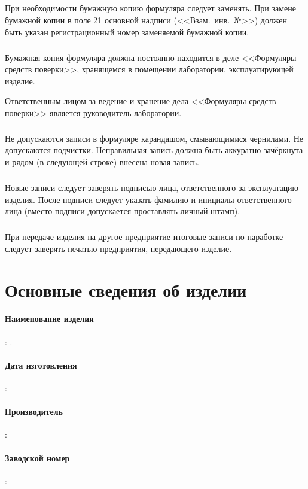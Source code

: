 \documentclass[twoside,pointsection]{gost2.105}
\begin{document}
	\subparagraph{} При необходимости бумажную копию формуляра следует заменять.
	При замене бумажной копии в поле 21 основной надписи (<<Взам.~инв.~№>>)
	должен быть указан регистрационный номер заменяемой бумажной копии.
	
	\subparagraph{} Бумажная копия формуляра должна постоянно находится в деле <<Формуляры средств поверки>>,
	хранящемся в помещении лаборатории, эксплуатирующей изделие.
	
	Ответственным лицом за ведение и хранение дела <<Формуляры средств поверки>> является руководитель
	лаборатории.
	
	\subparagraph{} Не допускаются записи в формуляре карандашом, смывающимися чернилами.
	Не допускаются подчистки.
	Неправильная запись должна быть аккуратно зачёркнута и рядом (в следующей строке) внесена новая запись.

	\subparagraph{} Новые записи следует заверять подписью лица, ответственного за эксплуатацию изделия.
	После подписи следует указать фамилию и инициалы ответственного лица (вместо подписи допускается
	проставлять личный штамп).

	\subparagraph{} При передаче изделия на другое предприятие итоговые записи по
	наработке следует заверять печатью предприятия, передающего изделие.


	\section{Основные сведения об изделии}
	
	\paragraph{Наименование изделия}: .

	\paragraph{Дата изготовления}:
	
	\paragraph{Производитель}:
	
	\paragraph{Заводской номер}:
	
\end{document}
